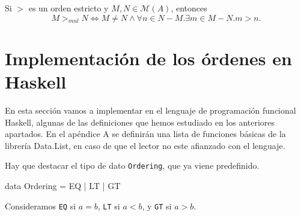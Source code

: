\begin{lema}\label{lemordsyss}
  Si $>$ es un orden estricto y $M,N \in \mathcal{M}(A)$, entonces
  \[ M >_{mul} N\Leftrightarrow M \neq N \wedge 
    \forall n \in N - M. \exists m \in M - N. m > n. \]
\end{lema}


\section{Implementación de los órdenes en Haskell}

En esta sección vamos a implementar en el lenguaje de programación
funcional Haskell, algunas de las definiciones que hemos estudiado en
los anteriores apartados. En el apéndice A se definirán una lista de
funciones básicas de la librería Data.List, en caso de que el lector
no este afianzado con el lenguaje.

Hay que destacar el tipo de dato \texttt{Ordering}, que ya viene predefinido.

\begin{preludio}
data Ordering = EQ | LT | GT
\end{preludio}

Consideramos \texttt{EQ} si $a = b$, \texttt{LT} si $a < b $, y
\texttt{GT} si $a > b$.

